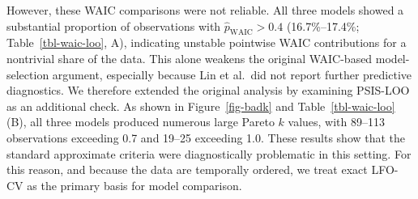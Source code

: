 \documentclass[
  man,
  floatsintext,
  longtable,
  nolmodern,
  notxfonts,
  notimes,
  colorlinks=true,linkcolor=blue,citecolor=blue,urlcolor=blue]{apa7}
\begin{document}
However, these WAIC comparisons were not reliable. All three models
showed a substantial proportion of observations with
\(\hat{p}_{\mathrm{WAIC}} > 0.4\) (16.7\%--17.4\%;
Table~\ref{tbl-waic-loo}, A), indicating unstable pointwise WAIC
contributions for a nontrivial share of the data. This alone weakens the
original WAIC-based model-selection argument, especially because Lin et
al.~did not report further predictive diagnostics. We therefore extended
the original analysis by examining PSIS-LOO as an additional check. As
shown in Figure~\ref{fig-badk} and Table~\ref{tbl-waic-loo} (B), all
three models produced numerous large Pareto \(k\) values, with 89--113
observations exceeding 0.7 and 19--25 exceeding 1.0. These results show
that the standard approximate criteria were diagnostically problematic
in this setting. For this reason, and because the data are temporally
ordered, we treat exact LFO-CV as the primary basis for model
comparison.
\end{document}
